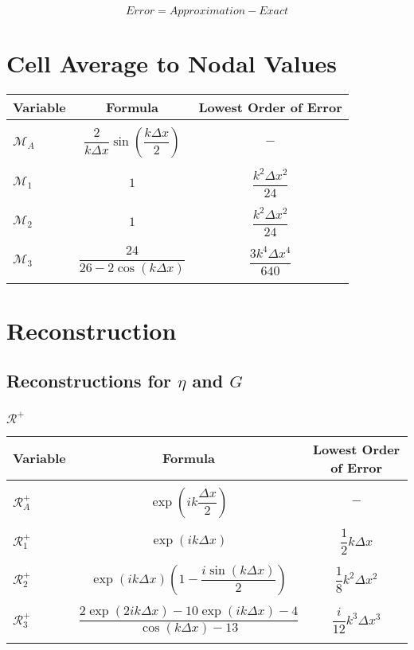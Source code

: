 \documentclass[12pt]{article}
\begin{document}
	
\[Error = Approximation - Exact\]	
 \section{Cell Average to Nodal Values}

\begin{tabular}{l  c  c}
	Variable& Formula& Lowest Order of Error \\
	\hline && \\
	$\mathcal{M}_A$& $\dfrac{2}{k \Delta x } \sin\left(\dfrac{k\Delta x}{2}\right)$ & $-$ \\ & & \\
	$\mathcal{M}_1$& $1$ & $\dfrac{k^2 \Delta x^2}{24}$ \\ & & \\
	$\mathcal{M}_2$& $1$ & $\dfrac{k^2 \Delta x^2}{24}$ \\ & & \\
	$\mathcal{M}_3$& $\dfrac{24}{26 - 2 \cos\left(k \Delta x\right)}$ & $\dfrac{3k^4 \Delta x^4}{640}$ \\ & & \\
\end{tabular}

 \section{Reconstruction}
 
  \subsection{Reconstructions for $\eta$ and $G$ }
  
  \subsubsection{$\mathcal{R}^+$}
 \begin{tabular}{l  c  c}
 	Variable& Formula& Lowest Order of Error\\
 	\hline && \\
 	$\mathcal{R}^+_A$& $\exp\left(i k \dfrac{\Delta x}{2}\right)$ & $-$ \\ & & \\
 	$\mathcal{R}^+_1$& $\exp\left(i k {\Delta x}\right)$ & $\dfrac{1}{2}k \Delta x$ \\ & & \\
 	$\mathcal{R}^+_2$& $\exp\left(i k {\Delta x}\right) \left(1 - \dfrac{i \sin\left(k\Delta x \right)}{2} \right)$ & $\dfrac{1}{8}k^2 \Delta x^2$ \\ & & \\
 	$\mathcal{R}^+_3$& $\dfrac{2\exp\left(2ik \Delta x\right) - 10\exp\left(ik \Delta x\right) - 4}{\cos\left(k \Delta x\right) - 13}$ & $\dfrac{i}{12}k^3 \Delta x^3$ \\ & & \\
 \end{tabular}
\end{document}

